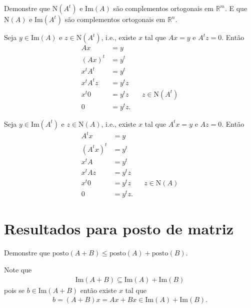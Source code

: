 \documentclass[a4paper,12pt, leqno, answers]{exam}
\newcommand{\EI}{\text{Im}}
\newcommand{\EN}{\text{N}}
\newcommand{\posto}{\text{posto}}
\begin{document}
\begin{questions}
    \question Demonstre que $\EN (A^t)$ e $\EI (A)$ s\~{a}o complementos ortogonais em $\mathbb{R}^m$. E que $\EN (A)$ e $\EI (A^t)$ s\~{a}o complementos ortogonais em $\mathbb{R}^n$.
    \begin{solution}
        Seja $y \in \EI (A)$ e $z \in \EN (A^t)$, i.e., existe $x$ tal que $A x = y$ e $A^t z = 0$. Ent\~{a}o
        \begin{align*}
            A x &= y \\
            \left( A x \right)^t &= y^t \\
            x^t A^t &= y^t \\
            x^t A^t z &= y^t z \\
            x^t 0 &= y^t z && z \in \EN (A^t) \\
            0 &= y^t z.
        \end{align*}

        Seja $y \in \EI (A^t)$ e $z \in \EN(A)$, i.e., existe $x$ tal que $A^t x = y$ e $A z = 0$. Ent\~{a}o
        \begin{align*}
            A^t x &= y \\
            \left( A^t x \right)^t &= y^t \\
            x^t A &= y^t \\
            x^t A z &= y^t z \\
            x^t 0 &= y^t z && z \in \EN (A) \\
            0 &= y^t z.
        \end{align*}
    \end{solution}

    \section*{Resultados para posto de matriz}

     Demonstre que $\posto (A + B) \leq \posto (A) + \posto (B)$.
    \begin{solution}
        Note que
        \begin{align*}
            \EI(A + B) \subseteq \EI(A) + \EI(B)
        \end{align*}
        pois se $b \in \EI(A + B)$ ent\~{a}o existe $x$ tal que
        \begin{align*}
            b = (A + B) x = Ax + Bx \in \EI(A) + \EI(B).
        \end{align*}


\end{solution}
\end{questions}
\end{document}
